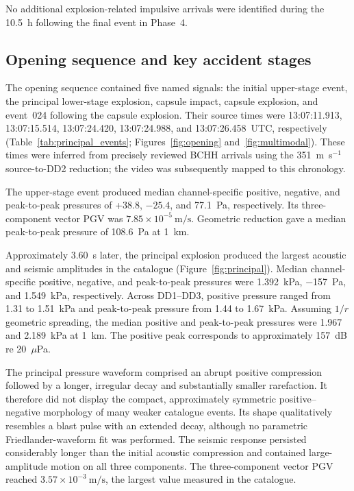\documentclass[]{seismica}
\begin{document}
No additional explosion-related impulsive arrivals were identified during the
10.5~h following the final event in Phase~4.


\subsection{Opening sequence and key accident stages}
\label{sec:results_principal}

The opening sequence contained five named signals: the initial upper-stage
event, the principal lower-stage explosion, capsule impact, capsule explosion,
and event~024 following the capsule explosion. Their source times were
13:07:11.913, 13:07:15.514, 13:07:24.420, 13:07:24.988, and 13:07:26.458~UTC,
respectively (Table~\ref{tab:principal_events}; Figures~\ref{fig:opening}
and~\ref{fig:multimodal}). These times were inferred from precisely reviewed
BCHH arrivals using the 351~m~s$^{-1}$ source-to-DD2 reduction; the video was
subsequently mapped to this chronology.

The upper-stage event produced median channel-specific positive, negative, and
peak-to-peak pressures of +38.8, $-25.4$, and 77.1~Pa, respectively. Its
three-component vector PGV was
$7.85\times10^{-5}\ \si{\metre\per\second}$. Geometric reduction gave a
median peak-to-peak pressure of 108.6~Pa at 1~km.

Approximately \SI{3.60}{\second} later, the principal explosion produced the
largest acoustic and seismic amplitudes in the catalogue
(Figure~\ref{fig:principal}). Median channel-specific positive, negative, and
peak-to-peak pressures were \SI{1.392}{\kilo\pascal},
\SI{-157}{\pascal}, and \SI{1.549}{\kilo\pascal}, respectively. Across
DD1--DD3, positive pressure ranged from 1.31 to 1.51~kPa and peak-to-peak
pressure from 1.44 to 1.67~kPa. Assuming $1/r$ geometric spreading, the median
positive and peak-to-peak pressures were 1.967 and 2.189~kPa at 1~km. The
positive peak corresponds to approximately 157~dB re 20~$\mu$Pa.

The principal pressure waveform comprised an abrupt positive compression
followed by a longer, irregular decay and substantially smaller rarefaction. It
therefore did not display the compact, approximately symmetric positive--negative
morphology of many weaker catalogue events. Its shape qualitatively resembles a
blast pulse with an extended decay, although no parametric Friedlander-waveform
fit was performed. The seismic response persisted considerably longer than the
initial acoustic compression and contained large-amplitude motion on all three
components. The three-component vector PGV reached
$3.57\times10^{-3}\ \si{\metre\per\second}$, the largest value measured in the
catalogue.
\end{document}
